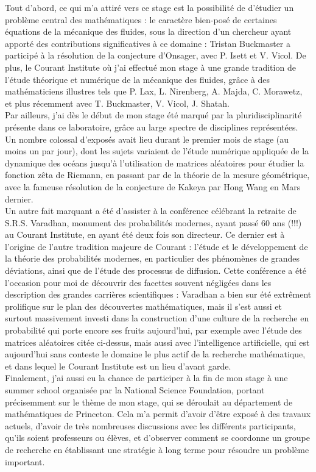 \documentclass[11pt,a4paper]{article}
\begin{document}
Tout d'abord, ce qui m'a attiré vers ce stage est la possibilité de d'étudier un problème central des mathématiques : le caractère bien-posé de certaines équations de la mécanique des fluides, sous la direction d'un chercheur ayant apporté des contributions significatives à ce domaine : Tristan Buckmaster a participé à la résolution de la conjecture d'Onsager, avec P. Isett et V. Vicol. De plus, le Courant Institute où j'ai effectué mon stage à une grande tradition de l'étude théorique et numérique de la mécanique des fluides, grâce à des mathématiciens illustres tels que P. Lax, L. Nirenberg, A. Majda, C. Morawetz, et plus récemment avec T. Buckmaster, V. Vicol, J. Shatah. \\

Par ailleurs, j'ai dès le début de mon stage été marqué par la pluridisciplinarité présente dans ce laboratoire, grâce au large spectre de disciplines représentées. Un nombre colossal d'exposés avait lieu durant le premier mois de stage (au moins un par jour), dont les sujets variaient de l'étude numérique appliquée de la dynamique des océans jusqu'à l'utilisation de matrices aléatoires pour étudier la fonction zêta de Riemann, en passant par de la théorie de la mesure géométrique, avec la fameuse résolution de la conjecture de Kakeya par Hong Wang en Mars dernier. \\
Un autre fait marquant a été d'assister à la conférence célébrant la retraite de S.R.S. Varadhan, monument des probabilités modernes, ayant passé 60 ans (!!!) au Courant Institute, en ayant été deux fois son directeur. Ce dernier est à l'origine de l'autre tradition majeure de Courant : l'étude et le développement de la théorie des probabilités modernes, en particulier des phénomènes de grandes déviations, ainsi que de l'étude des processus de diffusion. Cette conférence a été l'occasion pour moi de découvrir des facettes souvent négligées dans les description des grandes carrières scientifiques : Varadhan a bien sur été extrêment prolifique sur le plan des découvertes mathématiques, mais il s'est aussi et surtout massivement investi dans la construction d'une culture de la recherche en probabilité qui porte encore ses fruits aujourd'hui, par exemple avec l'étude des matrices aléatoires citée ci-dessus, mais aussi avec l'intelligence artificielle, qui est aujourd'hui sans conteste le domaine le plus actif de la recherche mathématique, et dans lequel le Courant Institute est un lieu d'avant garde. \\
Finalement, j'ai aussi eu la chance de participer  à la fin de mon stage à une summer school organisée par la National Science Foundation, portant précisemment sur le thème de mon stage, qui se déroulait au département de mathématiques de Princeton. Cela m'a permit d'avoir d'être exposé à des travaux actuels, d'avoir de très nombreuses discussions avec les différents participants, qu'ils soient professeurs ou élèves, et d'observer comment se coordonne un groupe de recherche en établissant une stratégie à long terme pour résoudre un problème important. \\
\end{document}
